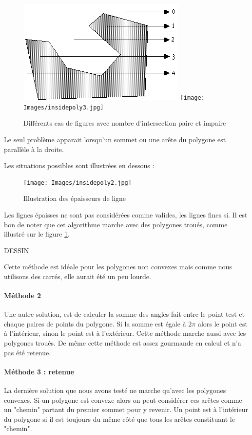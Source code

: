 \documentclass[a4paper,12pt]{report}
\begin{document}
\begin{figure}[h]
\includegraphics[scale=0.6]{Images/insidepoly1.jpg}
\texttt{[image: Images/insidepoly3.jpg]}
\caption{Différents cas de figures avec nombre d'intersection paire et impaire}
\label{nbintersect}
\end{figure}
\vspace{0.5cm}

Le seul problème apparait lorsqu'un sommet ou une arête du polygone est parallèle à la droite.

Les situations possibles sont illustrées en dessous :

\begin{figure}[h]
\centering
\texttt{[image: Images/insidepoly2.jpg]}
\caption{Illustration des épaisseurs de ligne}
\end{figure}
\vspace{0.5cm}

Les lignes épaisses ne sont pas considérées comme valides, les lignes fines si.
Il est bon de noter que cet algorithme marche avec des polygones troués, comme illustré sur le figure \ref{nbintersect}.

DESSIN

Cette méthode est idéale pour les polygones non convexes mais comme nous utilisons des carrés, elle aurait été un peu lourde.

\paragraph{Méthode 2 }
Une autre solution, est de calculer la somme des angles fait entre le point test et chaque paires de points du polygone. Si la somme est égale à $2\pi$ alors le point est à l'intérieur, sinon le point est à l'extérieur. 
Cette méthode marche aussi avec les polygones troués.
De même cette méthode est assez gourmande en calcul et n'a pas été retenue.

\paragraph{Méthode 3 : retenue}
La dernière solution que nous avons testé ne marche qu'avec les polygones convexes. Si un polygone est convexe alors on peut considérer ces arêtes comme un "chemin" partant du premier sommet pour y revenir. 
Un point est à l'intérieur du polygone si il est toujours du même côté que tous les arêtes constituant le "chemin".
\end{document}
